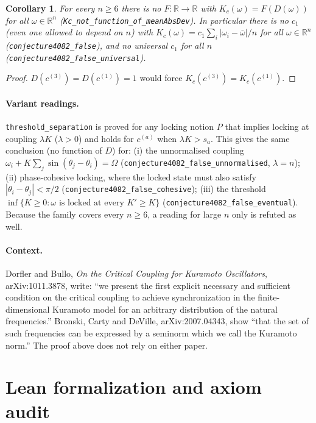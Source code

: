 \documentclass[11pt]{article}
\newtheorem{corollary}[theorem]{Corollary}
\theoremstyle{definition}
\theoremstyle{remark}
\begin{document}
\begin{corollary}
For every $n\ge 6$ there is no $F:\mathbb R\to\mathbb R$ with $K_c(\omega)=F(D(\omega))$ for all
$\omega\in\mathbb R^n$ (\texttt{Kc\_not\_function\_of\_meanAbsDev}). In particular there is no
$c_1$ (even one allowed to depend on $n$) with
$K_c(\omega)=c_1\sum_i|\omega_i-\bar\omega|/n$ for all $\omega\in\mathbb R^n$
(\texttt{conjecture4082\_false}), and no universal $c_1$ for all $n$
(\texttt{conjecture4082\_false\_universal}).
\end{corollary}
\begin{proof}
$D(c^{(3)})=D(c^{(1)})=1$ would force $K_c(c^{(3)})=K_c(c^{(1)})$.
\end{proof}

\paragraph{Variant readings.} \texttt{threshold\_separation} is proved for any locking notion
$P$ that implies locking at coupling $\lambda K$ ($\lambda>0$) and holds for $c^{(a)}$ when
$\lambda K>s_a$. This gives the same conclusion (no function of $D$) for:
(i) the unnormalised coupling $\omega_i+K\sum_j\sin(\theta_j-\theta_i)=\Omega$
(\texttt{conjecture4082\_false\_unnormalised}, $\lambda=n$);
(ii) phase-cohesive locking, where the locked state must also satisfy
$|\theta_i-\theta_j|<\pi/2$ (\texttt{conjecture4082\_false\_cohesive});
(iii) the threshold $\inf\{K\ge0:\omega \text{ is locked at every } K'\ge K\}$
(\texttt{conjecture4082\_false\_eventual}).
Because the family covers every $n\ge 6$, a reading for large $n$ only is refuted as well.

\paragraph{Context.} Dorfler and Bullo, \emph{On the Critical Coupling for Kuramoto Oscillators},
arXiv:1011.3878, write: ``we present the first explicit necessary and sufficient condition on the
critical coupling to achieve synchronization in the finite-dimensional Kuramoto model for an
arbitrary distribution of the natural frequencies.'' Bronski, Carty and DeVille,
arXiv:2007.04343, show ``that the set of such frequencies can be expressed by a seminorm which we
call the Kuramoto norm.'' The proof above does not rely on either paper.

\section{Lean formalization and axiom audit}
\end{document}
